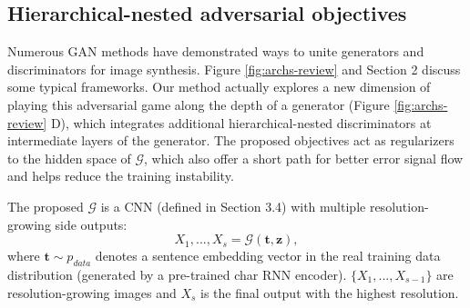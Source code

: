 \documentclass[10pt,twocolumn,letterpaper]{article}
\begin{document}
\subsection{Hierarchical-nested adversarial objectives}
Numerous GAN methods have demonstrated ways to unite generators and discriminators for image synthesis. Figure \ref{fig:archs-review} and Section 2 discuss some typical frameworks.
Our method actually explores a new dimension of playing this adversarial game along the depth of a generator (Figure \ref{fig:archs-review} D), which integrates additional hierarchical-nested  discriminators at intermediate layers of the generator. 
The proposed objectives act as regularizers to the hidden space of $\mathcal{G}$, which also offer a short path for better error signal flow and helps reduce the training instability.

The proposed $\mathcal{G}$ is a CNN (defined in Section 3.4) with multiple resolution-growing side outputs:
\begin{equation}
\label{side}
X_1,..., X_s = \mathcal{G}(\bm t, \bm z), 
\end{equation}
where  $\bm t\sim p_{data}$ denotes a sentence embedding vector in the real training data distribution (generated by a pre-trained char RNN encoder). $\{X_1,...,X_{s-1}\}$ are resolution-growing images and $X_s$ is the final output with the highest resolution.


\end{document}
